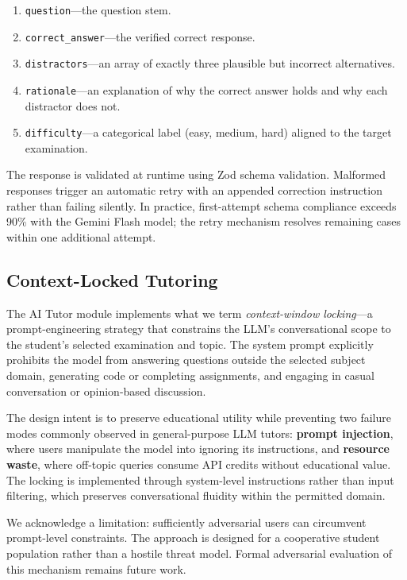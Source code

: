 \documentclass[conference]{IEEEtran}
\begin{document}
\begin{enumerate}[leftmargin=*]
    \item \texttt{question}---the question stem.
    \item \texttt{correct\_answer}---the verified correct response.
    \item \texttt{distractors}---an array of exactly three plausible but incorrect alternatives.
    \item \texttt{rationale}---an explanation of why the correct answer holds and why each distractor does not.
    \item \texttt{difficulty}---a categorical label (easy, medium, hard) aligned to the target examination.
\end{enumerate}

The response is validated at runtime using Zod schema validation. Malformed responses trigger an automatic retry with an appended correction instruction rather than failing silently. In practice, first-attempt schema compliance exceeds 90\% with the Gemini Flash model; the retry mechanism resolves remaining cases within one additional attempt.

\subsection{Context-Locked Tutoring}

The AI Tutor module implements what we term \textit{context-window locking}---a prompt-engineering strategy that constrains the LLM's conversational scope to the student's selected examination and topic. The system prompt explicitly prohibits the model from answering questions outside the selected subject domain, generating code or completing assignments, and engaging in casual conversation or opinion-based discussion.

The design intent is to preserve educational utility while preventing two failure modes commonly observed in general-purpose LLM tutors: \textbf{prompt injection}, where users manipulate the model into ignoring its instructions, and \textbf{resource waste}, where off-topic queries consume API credits without educational value. The locking is implemented through system-level instructions rather than input filtering, which preserves conversational fluidity within the permitted domain.

We acknowledge a limitation: sufficiently adversarial users can circumvent prompt-level constraints. The approach is designed for a cooperative student population rather than a hostile threat model. Formal adversarial evaluation of this mechanism remains future work.
\end{document}
